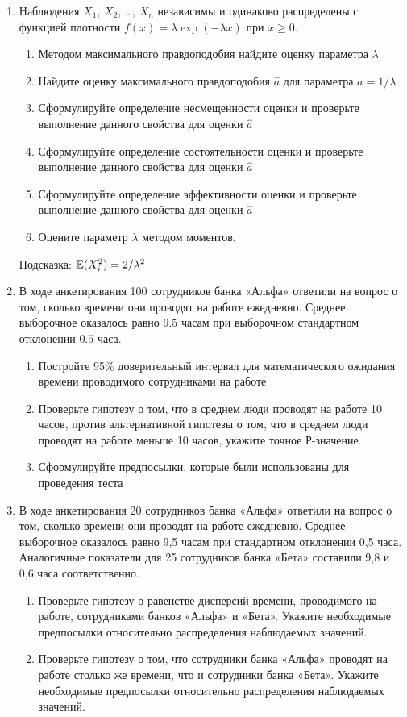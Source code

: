 \documentclass[12pt, a4paper]{article}\usepackage[]{graphicx}\usepackage[]{color}
\begin{document}
\begin{enumerate}
\item Наблюдения $X_1$, $X_2$, \ldots, $X_n$ независимы и одинаково распределены с функцией плотности $f(x)=\lambda \exp(-\lambda x)$ при $x\geq 0$.
\begin{enumerate}
\item Методом максимального правдоподобия найдите оценку параметра  $\lambda$
\item Найдите оценку максимального правдоподобия $\hat{a}$ для параметра $a=1/\lambda$
\item Сформулируйте определение несмещенности оценки и проверьте выполнение данного свойства для оценки $\hat{a}$
\item Сформулируйте определение состоятельности оценки и проверьте выполнение данного свойства для оценки $\hat{a}$
\item Сформулируйте определение эффективности  оценки и проверьте выполнение данного свойства для оценки $\hat{a}$
\item Оцените параметр $\lambda$ методом моментов.
\end{enumerate}
Подсказка: $\mathbb{E}(X_i^2)=2/\lambda^2$

\item В ходе анкетирования 100 сотрудников банка «Альфа» ответили на вопрос о том, сколько времени они проводят на работе ежедневно. Среднее выборочное оказалось равно $9.5$ часам при выборочном стандартном отклонении $0.5$ часа.
\begin{enumerate}
\item Постройте 95\% доверительный интервал для математического ожидания времени проводимого сотрудниками на работе
\item Проверьте гипотезу о том, что в среднем люди проводят на работе 10 часов, против альтернативной гипотезы о том, что в среднем люди проводят на работе меньше 10 часов, укажите точное Р-значение.
\item Сформулируйте предпосылки, которые были использованы для проведения теста
\end{enumerate}

\item В ходе анкетирования 20 сотрудников банка «Альфа» ответили на вопрос о том, сколько времени они проводят на работе ежедневно. Среднее выборочное оказалось равно 9,5 часам при стандартном отклонении 0,5 часа. Аналогичные показатели для 25 сотрудников банка «Бета» составили 9,8 и 0,6 часа соответственно.
\begin{enumerate}
\item Проверьте гипотезу о равенстве дисперсий времени, проводимого на работе, сотрудниками банков «Альфа» и «Бета». Укажите необходимые предпосылки относительно распределения наблюдаемых значений.
\item Проверьте гипотезу о том, что сотрудники банка «Альфа» проводят на работе столько же времени, что и сотрудники банка «Бета». Укажите необходимые предпосылки относительно распределения наблюдаемых значений.
\end{enumerate}

\end{enumerate}
\end{document}
